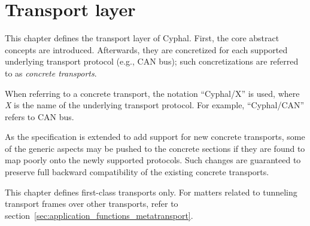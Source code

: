 \chapter{Transport layer}\label{sec:transport}

This chapter defines the transport layer of Cyphal.
First, the core abstract concepts are introduced.
Afterwards, they are concretized for each supported underlying transport protocol (e.g., CAN bus);
such concretizations are referred to as \emph{concrete transports}.

When referring to a concrete transport, the notation ``Cyphal/X'' is used,
where \emph{X} is the name of the underlying transport protocol.
For example, ``Cyphal/CAN'' refers to CAN bus.

As the specification is extended to add support for new concrete transports,
some of the generic aspects may be pushed to the concrete sections
if they are found to map poorly onto the newly supported protocols.
Such changes are guaranteed to preserve full backward compatibility of the existing concrete transports.

This chapter defines first-class transports only.
For matters related to tunneling transport frames over other transports,
refer to section~\ref{sec:application_functions_metatransport}.

\clearpage
\clearpage
\clearpage
\clearpage
